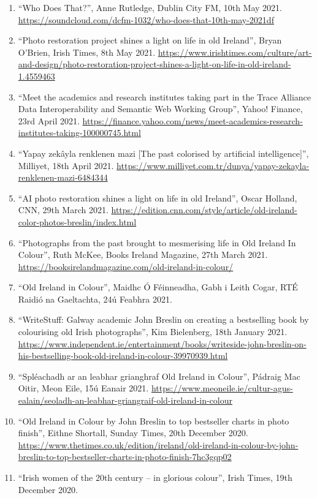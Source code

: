 \documentclass[10pt,a4paper]{res} %
\begin{document}
\begin{resume}
{\begin{enumerate}
\item ``Who Does That?'', Anne Rutledge, Dublin City FM, 10th May 2021. \url{https://soundcloud.com/dcfm-1032/who-does-that-10th-may-2021df}
\item ``Photo restoration project shines a light on life in old Ireland'', Bryan O'Brien, Irish Times, 8th May 2021. \url{https://www.irishtimes.com/culture/art-and-design/photo-restoration-project-shines-a-light-on-life-in-old-ireland-1.4559463}
\item ``Meet the academics and research institutes taking part in the Trace Alliance Data Interoperability and Semantic Web Working Group'', Yahoo! Finance, 23rd April 2021. \url{https://finance.yahoo.com/news/meet-academics-research-institutes-taking-100000745.html}
\item ``Yapay zek\^{a}yla renklenen mazi [The past colorised by artificial intelligence]'', Milliyet, 18th April 2021. \url{https://www.milliyet.com.tr/dunya/yapay-zekayla-renklenen-mazi-6484344}
\item ``AI photo restoration shines a light on life in old Ireland'', Oscar Holland, CNN, 29th March 2021. \url{https://edition.cnn.com/style/article/old-ireland-color-photos-breslin/index.html}
\item ``Photographs from the past brought to mesmerising life in Old Ireland In Colour'', Ruth McKee, Books Ireland Magazine, 27th March 2021. \url{https://booksirelandmagazine.com/old-ireland-in-colour/}
\item ``Old Ireland in Colour'', Maidhc \'{O} F\'{e}inneadha, Gabh i Leith Cogar, RT\'{E} Raidi\'{o} na Gaeltachta, 24\'{u} Feabhra 2021.
\item ``WriteStuff: Galway academic John Breslin on creating a bestselling book by colourising old Irish photographs'', Kim Bielenberg, 18th January 2021. \url{https://www.independent.ie/entertainment/books/writeside-john-breslin-on-his-bestselling-book-old-ireland-in-colour-39970939.html}
\item ``Spl\'{e}achadh ar an leabhar grianghraf Old Ireland in Colour'', P\'{a}draig Mac Oitir, Meon Eile, 15\'{u} Eanair 2021. \url{https://www.meoneile.ie/cultur-agus-ealain/seoladh-an-leabhar-griangraif-old-ireland-in-colour}
\item ``Old Ireland in Colour by John Breslin to top bestseller charts in photo finish'', Eithne Shortall, Sunday Times, 20th December 2020. \url{https://www.thetimes.co.uk/edition/ireland/old-ireland-in-colour-by-john-breslin-to-top-bestseller-charts-in-photo-finish-7hc3gqp02}
\item ``Irish women of the 20th century – in glorious colour'', Irish Times, 19th December 2020.

\end{enumerate}}
\end{resume}
\end{document}
